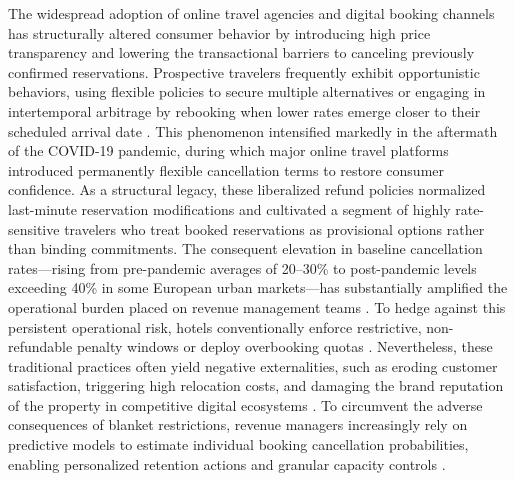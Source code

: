 \documentclass[pdflatex,iicol,sn-mathphys-ay]{sn-jnl}
\theoremstyle{thmstyleone}%
\theoremstyle{thmstyletwo}%
\theoremstyle{thmstylethree}%
\begin{document}
The widespread adoption of online travel agencies and digital booking channels has structurally altered consumer behavior by introducing high price transparency and lowering the transactional barriers to canceling previously confirmed reservations. Prospective travelers frequently exhibit opportunistic behaviors, using flexible policies to secure multiple alternatives \citep{chen2023prediction} or engaging in intertemporal arbitrage by rebooking when lower rates emerge \citep{mir2026decoding} closer to their scheduled arrival date \citep{ampountolas2025predicting}. This phenomenon intensified markedly in the aftermath of the COVID-19 pandemic, during which major online travel platforms introduced permanently flexible cancellation terms to restore consumer confidence. As a structural legacy, these liberalized refund policies normalized last-minute reservation modifications and cultivated a segment of highly rate-sensitive travelers who treat booked reservations as provisional options rather than binding commitments. The consequent elevation in baseline cancellation rates—rising from pre-pandemic averages of 20–30\% to post-pandemic levels exceeding 40\% in some European urban markets—has substantially amplified the operational burden placed on revenue management teams \citep{mir2026decoding}. To hedge against this persistent operational risk, hotels conventionally enforce restrictive, non-refundable penalty windows \citep{yang2024predicting} or deploy overbooking quotas \citep{antonio2017predicting}. Nevertheless, these traditional practices often yield negative externalities, such as eroding customer satisfaction, triggering high relocation costs, and damaging the brand reputation of the property in competitive digital ecosystems \citep{falk2018modelling}. To circumvent the adverse consequences of blanket restrictions, revenue managers increasingly rely on predictive models to estimate individual booking cancellation probabilities, enabling personalized retention actions and granular capacity controls \citep{antonio2017predicting, liu2023hospitality, talal2025hotel}.
\end{document}
